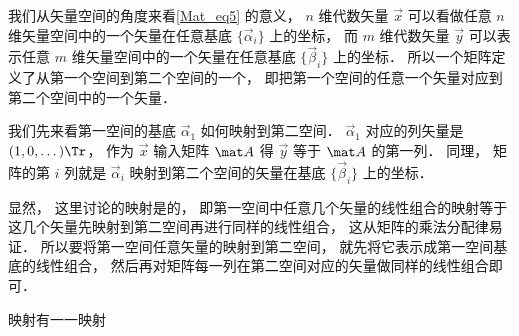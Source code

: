 
我们从矢量空间的角度来看\autoref{Mat_eq5} 的意义， $n$ 维代数矢量 $\vec x$ 可以看做任意 $n$ 维矢量空间中的一个矢量在任意基底 $\{\vec \alpha_i\}$ 上的坐标， 而 $m$ 维代数矢量 $\vec y$ 可以表示任意 $m$ 维矢量空间中的一个矢量在任意基底 $\{\vec \beta_i\}$ 上的坐标． 所以一个矩阵定义了从第一个空间到第二个空间的一个， 即把第一个空间的任意一个矢量对应到第二个空间中的一个矢量． 

我们先来看第一空间的基底 $\vec \alpha_1$ 如何映射到第二空间． $\vec\alpha_1$ 对应的列矢量是 $(1, 0, \dots)\Tr$， 作为 $\vec x$ 输入矩阵 $\mat A$ 得 $\vec y$ 等于 $\mat A$ 的第一列． 同理， 矩阵的第 $i$ 列就是 $\vec\alpha_i$ 映射到第二个空间的矢量在基底 $\{\vec \beta_i\}$ 上的坐标．

显然， 这里讨论的映射是的， 即第一空间中任意几个矢量的线性组合的映射等于这几个矢量先映射到第二空间再进行同样的线性组合， 这从矩阵的乘法分配律易证． 所以要将第一空间任意矢量的映射到第二空间， 就先将它表示成第一空间基底的线性组合， 然后再对矩阵每一列在第二空间对应的矢量做同样的线性组合即可．

映射有一一映射




